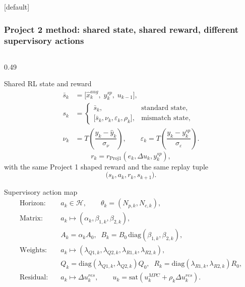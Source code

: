 \documentclass[aspectratio=169]{beamer}
\begin{document}
\begin{frame}
[default]
\frametitle{\large \textbf{Project 2 method: shared state, shared reward, different supervisory actions}}
\scriptsize
\vspace{-0.32cm}

\begin{columns}[T,onlytextwidth]

\begin{column}{0.49\textwidth}

\begin{block}{Shared RL state and reward}
\justifying
\[
\begin{aligned}
\bar{s}_k &= \big[\hat{x}^{aug}_k,\; y_k^{sp},\; u_{k-1}\big], \\
s_k &= 
\begin{cases}
\bar{s}_k, & \text{standard state},\\
\big[\bar{s}_k,\nu_k,\varepsilon_k,\rho_k\big], & \text{mismatch state},
\end{cases} \\
\nu_k &= T\!\left(\dfrac{y_k-\hat{y}_k}{\sigma_\nu}\right), \qquad
\varepsilon_k = T\!\left(\dfrac{y_k-y_k^{sp}}{\sigma_\varepsilon}\right).
\end{aligned}
\]
\[
r_k = r_{\mathrm{Proj1}}(e_k,\Delta u_k,y_k^{sp}),
\]
with the same Project 1 shaped reward and the same replay tuple
\[
\big(s_k,a_k,r_k,s_{k+1}\big).
\]
\end{block}

\vspace{0.02cm}

\begin{block}{Supervisory action map}
\justifying
\[
\begin{aligned}
\text{Horizon:}\quad & a_k \in \mathcal{H}, \qquad \theta_k=(N_{p,k},N_{c,k}), \\
\text{Matrix:}\quad & a_k \mapsto (\alpha_k,\beta_{1,k},\beta_{2,k}), \\
& A_k=\alpha_k A_0,\;\; B_k=B_0\,\mathrm{diag}(\beta_{1,k},\beta_{2,k}), \\
\text{Weights:}\quad & a_k \mapsto (\lambda_{Q1,k},\lambda_{Q2,k},\lambda_{R1,k},\lambda_{R2,k}), \\
& Q_k=\mathrm{diag}(\lambda_{Q1,k},\lambda_{Q2,k})Q_0,\;\;
R_k=\mathrm{diag}(\lambda_{R1,k},\lambda_{R2,k})R_0, \\
\text{Residual:}\quad & a_k \mapsto \Delta u_k^{res}, \qquad
u_k=\mathrm{sat}\!\left(u_k^{MPC}+\rho_k\Delta u_k^{res}\right).
\end{aligned}
\]
\end{block}


\end{column}
\end{columns}
\end{frame}
\end{document}
